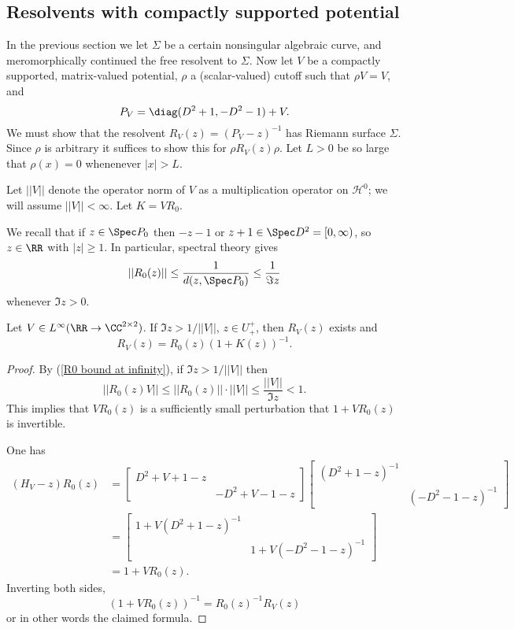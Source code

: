 \subsection{Resolvents with compactly supported potential}
In the previous section  we let $\Sigma$ be a certain nonsingular algebraic curve, and meromorphically continued the free resolvent to $\Sigma$.
Now let $V$ be a compactly supported, matrix-valued potential, $\rho$ a (scalar-valued) cutoff such that $\rho V = V$, and
$$P_V = \diag(D^2 + 1, -D^2 - 1) + V.$$
We must show that the resolvent $R_V(z) = (P_V - z)^{-1}$ has Riemann surface $\Sigma$.
Since $\rho$ is arbitrary it suffices to show this for $\rho R_V(z) \rho$.
Let $L > 0$ be so large that $\rho(x) = 0$ whenenever $|x| > L$.

Let $||V||$ denote the operator norm of $V$ as a multiplication operator on $\mathcal H^0$; we will assume $||V|| < \infty$.
Let $K = VR_0$.

We recall that if $z \in \Spec P_0$ then $-z - 1$ or $z + 1 \in \Spec D^2 = [0, \infty)$, so $z \in \RR$ with $|z| \geq 1$.
In particular, spectral theory gives
\begin{equation}
\label{R0 bound at infinity}
||R_0(z)|| \leq \frac{1}{d(z, \Spec P_0)} \leq \frac{1}{\Im z}
\end{equation}
whenever $\Im z > 0$.

\begin{lemma}
Let $V \in L^\infty(\RR \to \CC^{2 \times 2})$.
If $\Im z > 1/||V||$, $z \in U^+_+$, then $R_V(z)$ exists and
\begin{equation}
\label{resolvent equation}
R_V(z) = R_0(z)(1 + K(z))^{-1}.
\end{equation}
\end{lemma}
\begin{proof}
By (\ref{R0 bound at infinity}), if $\Im z > 1/||V||$ then
$$||R_0(z)V|| \leq ||R_0(z)||\cdot ||V|| \leq \frac{||V||}{\Im z} < 1.$$
This implies that $VR_0(z)$ is a sufficiently small perturbation that $1 + VR_0(z)$ is invertible.

One has
\begin{align*}(H_V - z)R_0(z) &= \begin{bmatrix}D^2 + V + 1 - z\\& -D^2 + V - 1 - z\end{bmatrix}\begin{bmatrix}(D^2 + 1 - z)^{-1}\\&(-D^2-1-z)^{-1}\end{bmatrix}\\
 &= \begin{bmatrix}1 + V(D^2 + 1 - z)^{-1}\\&1 + V(-D^2 - 1 - z)^{-1}\end{bmatrix}
 \\& = 1 + VR_0(z).
 \end{align*}
Inverting both sides,
$$(1 + VR_0(z))^{-1} = R_0(z)^{-1}R_V(z)$$
or in other words the claimed formula.
\end{proof}

